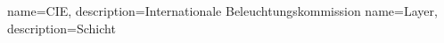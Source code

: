 {
	name=CIE,
	description={Internationale Beleuchtungskommission}
}
{
	name=Layer,
	description={Schicht}
}

